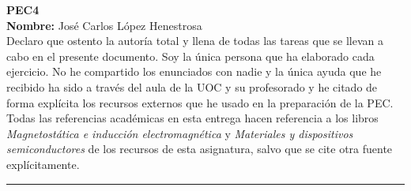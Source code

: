 \documentclass[11pt, a4paper]{article}
\begin{document}
	\begin{center}
		\Large{ \textbf{PEC4} } \\
		\vspace{0.5cm}
		\normalsize{\textbf{Nombre:} José Carlos López Henestrosa} \\
		\vspace{0.5cm}
		\normalsize{Declaro que ostento la autoría total y llena de todas las tareas que se llevan a cabo en el presente documento. Soy la única persona que ha elaborado cada ejercicio. No he compartido los enunciados con nadie y la única ayuda que he recibido ha sido a través del aula de la UOC y su profesorado y he citado de forma explícita los recursos externos que he usado en la preparación de la PEC.} \\
		\vspace{0.5cm}
		\normalsize{Todas las referencias académicas en esta entrega hacen referencia a los libros \textit{Magnetostática e inducción electromagnética} y \textit{Materiales y dispositivos semiconductores} de los recursos de esta asignatura, salvo que se cite otra fuente explícitamente.}
	\end{center}

	\vspace{1cm}
	\hrule
	\vspace{1cm}
\end{document}
